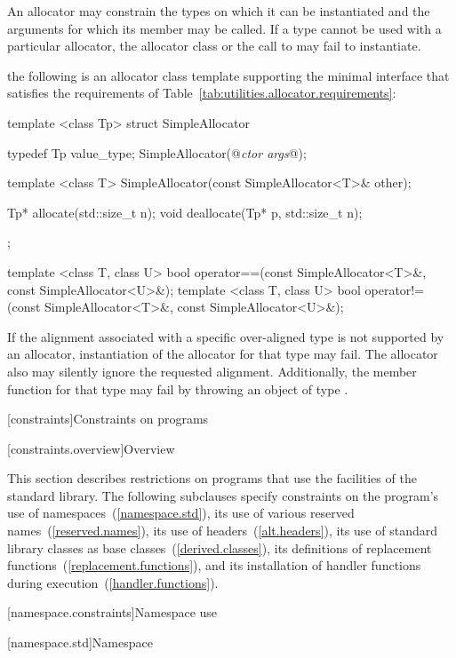 \pnum
An allocator may constrain the types on which it can be instantiated and the
arguments for which its  member may be called. If a type
cannot be used with a particular allocator, the allocator class or the call to
 may fail to instantiate.

\enterexample the following is an allocator class template supporting the minimal
interface that satisfies the requirements of
Table~\ref{tab:utilities.allocator.requirements}:

\begin{codeblock}
template <class Tp>
struct SimpleAllocator {
  typedef Tp value_type;
  SimpleAllocator(@\textit{ctor args}@);

  template <class T> SimpleAllocator(const SimpleAllocator<T>& other);

  Tp* allocate(std::size_t n);
  void deallocate(Tp* p, std::size_t n);
};

template <class T, class U>
bool operator==(const SimpleAllocator<T>&, const SimpleAllocator<U>&);
template <class T, class U>
bool operator!=(const SimpleAllocator<T>&, const SimpleAllocator<U>&);
\end{codeblock}
\exitexample

\pnum
If the alignment associated with a specific over-aligned type is not
supported by an allocator, instantiation of the allocator for that type may
fail. The allocator also may silently ignore the requested alignment.
\enternote Additionally, the member function 
for that type may fail by throwing an object of type
.\exitnote

[constraints]{Constraints on programs}

[constraints.overview]{Overview}

\pnum
This section describes restrictions on \Cpp programs that use the facilities of
the \Cpp standard library. The following subclauses specify constraints on the
program's use of namespaces~(\ref{namespace.std}), its use of various reserved
names~(\ref{reserved.names}), its use of headers~(\ref{alt.headers}), its use of
standard library classes as base classes~(\ref{derived.classes}), its
definitions of replacement functions~(\ref{replacement.functions}), and its
installation of handler functions during execution~(\ref{handler.functions}).

[namespace.constraints]{Namespace use}

[namespace.std]{Namespace }

